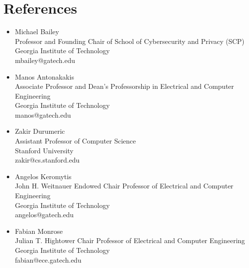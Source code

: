 \documentclass[10pt,singlecolumn]{article} %
\begin{document}
\newpage

\section{References}

\begin{itemize}[label={}]
\setlength\itemsep{0.2em}
\item Michael Bailey\\
Professor and Founding Chair of School of Cybersecurity and Privacy (SCP)\\
Georgia Institute of Technology\\
mbailey@gatech.edu

\item Manos Antonakakis\\
Associate Professor and Dean's Professorship in Electrical and Computer Engineering\\
Georgia Institute of Technology\\
manos@gatech.edu


\item Zakir Durumeric \\
Assistant Professor of Computer Science \\
Stanford University \\
zakir@cs.stanford.edu 

\item Angelos Keromytis \\
John H. Weitnauer Endowed Chair Professor of Electrical and Computer Engineering \\
Georgia Institute of Technology \\
angelos@gatech.edu 

\item Fabian Monrose \\
Julian T. Hightower Chair Professor of Electrical and Computer Engineering \\
Georgia Institute of Technology \\
fabian@ece.gatech.edu 

\end{itemize}



%
%	
	
\end{document}
